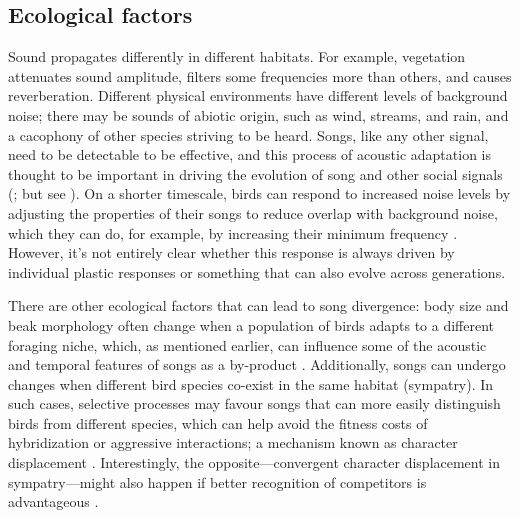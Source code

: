 \subsection{Ecological factors}
Sound propagates differently in different habitats. For example, vegetation attenuates sound amplitude, filters some frequencies more than others, and causes reverberation. Different physical environments have different levels of background noise; there may be sounds of abiotic origin, such as wind, streams, and rain, and a cacophony of other species striving to be heard. Songs, like any other signal, need to be detectable to be effective, and this process of acoustic adaptation is thought to be important in driving the evolution of song and other social signals (\cite{Endler1992,Grant2010,Tobias2010}; but see \cite{mikula2020}). On a shorter timescale, birds can respond to increased noise levels by adjusting the properties of their songs to reduce overlap with background noise, which they can do, for example, by increasing their minimum frequency \autocite{winandy2021, liu2020, derryberry2020, roca2016, nemeth2013, halfwerk2011, brumm2004}. However, it's not entirely clear whether this response is always driven by individual plastic responses or something that can also evolve across generations.

There are other ecological factors that can lead to song divergence: body size and beak morphology often change when a population of birds adapts to a different foraging niche, which, as mentioned earlier, can influence some of the acoustic and temporal features of songs as a by-product \autocite{mayr1963,podos2001}. Additionally, songs can undergo changes when different bird species co-exist in the same habitat (sympatry). In such cases, selective processes may favour songs that can more easily distinguish birds from different species, which can help avoid the fitness costs of hybridization or aggressive interactions; a mechanism known as character displacement \autocite{seddon2005}. Interestingly, the opposite---convergent character displacement in sympatry---might also happen if better recognition of competitors is advantageous \autocite{grant1972, Tobias2014, Tobias2009}. 

